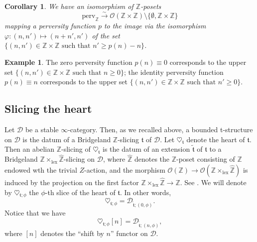 \documentclass{article}
\newtheorem{cor}[thm]{Corollary}
\theoremstyle{definition}
\newtheorem{exmp}[thm]{Example}
\newcommand{\Z}{\mathbb{Z}}
\newcommand{\Oo}{\mathcal{O}}
\newcommand{\tee}{\mathfrak{t}}
\begin{document}
\begin{cor}\label{corperv}
We have an isomorphism of $\Z$-posets
\[
\mathrm{perv}_\Z\xrightarrow{\sim} \Oo(\Z\times \Z)\setminus\{\emptyset,\Z\times\Z\}
\]
mapping a perversity function $p$ to the image via the isomorphism $\varphi\colon (n,n')\mapsto (n+n',n')$ of the set $\{(n,n')\in \Z\times \Z\text{ such that } n'\geq p(n)-n\}$.
\end{cor}
\begin{exmp}
The zero perversity function $p(n)\equiv 0$ corresponds to the upper set $\{(n,n')\in \Z\times \Z\text{ such that } n\geq 0\}$; the identity perversity function $p(n)\equiv n$ corresponds to the upper set $\{(n,n')\in \Z\times \Z\text{ such that } n'\geq 0\}$.
\end{exmp}

\subsection{Slicing the heart}
Let $\mathscr{D}$ be a stable $\infty$-category. Then, as we recalled above, a bounded t-structure on $\mathscr{D}$ is the datum of a Bridgeland $\Z$-slicing $\tee$ of $\mathscr{D}$. Let $\heartsuit_{\mathfrak{t}}$ denote the heart of $\mathfrak{t}$. Then an abelian $\Z$-slicing of $\heartsuit_{\mathfrak{t}}$ is the datum of an extension $\tilde{\tee}$ of $\tee$ to a Bridgeland $\Z\times_{\mathrm{lex}}\hat{\Z}$-slicing on $\mathscr{D}$, where $\hat{\Z}$ denotes the $\Z$-poset consisting of $\Z$ endowed wth the trivial $Z$-action, and the morphism $\Oo(\Z)\to \Oo(\Z\times_{\mathrm{lex}}\hat{\Z})$ is induced by the projection on the first factor $\Z\times_{\mathrm{lex}}\hat{\Z}\to \Z$. See \cite[Section??]{??}. We will denote by $\heartsuit_{\tee;\phi}$ the $\phi$-th slice of the heart of $\tee$. In other words,
\[
\heartsuit_{\tee;\phi}=\mathscr{D}_{\tilde{\tee};(0,\phi)}.
\]
Notice that we have
\[
\heartsuit_{\tee;\phi}[n]=\mathscr{D}_{\tilde{\tee};(n,\phi)},
\]
where $[n]$ denotes the ``shift by $n$'' functor on $\mathscr{D}$.
\end{document}
